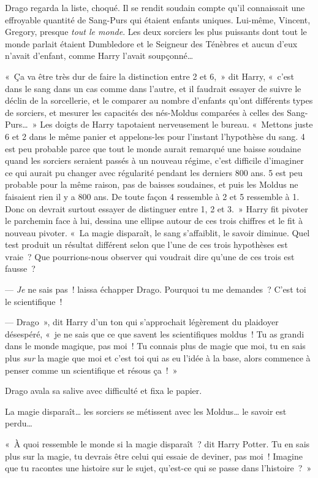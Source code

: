 Drago regarda la liste, choqué. Il se rendit soudain compte qu'il connaissait une effroyable quantité de Sang-Purs qui étaient enfants uniques. Lui-même, Vincent, Gregory, presque \emph{tout le monde}. Les deux sorciers les plus puissants dont tout le monde parlait étaient Dumbledore et le Seigneur des Ténèbres et aucun d'eux n'avait d'enfant, comme Harry l'avait soupçonné…

«~Ça va être très dur de faire la distinction entre 2 et 6,~» dit Harry, «~c'est dans le sang dans un cas comme dans l'autre, et il faudrait essayer de suivre le déclin de la sorcellerie, et le comparer au nombre d'enfants qu'ont différents types de sorciers, et mesurer les capacités des nés-Moldus comparées à celles des Sang-Purs…~» Les doigts de Harry tapotaient nerveusement le bureau. «~Mettons juste 6 et 2 dans le même panier et appelons-les pour l'instant l'hypothèse du sang. 4 est peu probable parce que tout le monde aurait remarqué une baisse soudaine quand les sorciers seraient passés à un nouveau régime, c'est difficile d'imaginer ce qui aurait pu changer avec régularité pendant les derniers 800 ans. 5 est peu probable pour la même raison, pas de baisses soudaines, et puis les Moldus ne faisaient rien il y a 800 ans. De toute façon 4 ressemble à 2 et 5 ressemble à 1. Donc on devrait surtout essayer de distinguer entre 1, 2 et 3.~» Harry fit pivoter le parchemin face à lui, dessina une ellipse autour de ces trois chiffres et le fit à nouveau pivoter. «~La magie disparaît, le sang s'affaiblit, le savoir diminue. Quel test produit un résultat différent selon que l'une de ces trois hypothèses est vraie~? Que pourrions-nous observer qui voudrait dire qu'une de ces trois est fausse~?

--- \emph{Je} ne sais pas~! laissa échapper Drago. Pourquoi tu me demandes~? C'est toi le scientifique~!

--- Drago~», dit Harry d'un ton qui s'approchait légèrement du plaidoyer désespéré, «~je ne sais que ce que savent les scientifiques moldus~! Tu as grandi dans le monde magique, pas moi~! Tu connais plus de magie que moi, tu en sais plus \emph{sur} la magie que moi et c'est toi qui as eu l'idée à la base, alors commence à penser comme un scientifique et résous ça~!~»

Drago avala sa salive avec difficulté et fixa le papier.

La magie disparaît… les sorciers se métissent avec les Moldus… le savoir est perdu…

«~À quoi ressemble le monde si la magie disparaît~? dit Harry Potter. Tu en sais plus sur la magie, tu devrais être celui qui essaie de deviner, pas moi~! Imagine que tu racontes une histoire sur le sujet, qu'est-ce qui se passe dans l'histoire~?~»

